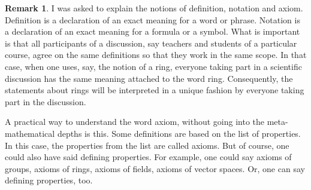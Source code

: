 \documentclass[11pt]{article}
\theoremstyle{plain}
\theoremstyle{definition}
\newtheorem{rem}[theorem]{Remark}
\begin{document}
 \begin{rem} 
 	I was asked to explain the notions of definition, notation and axiom. Definition is a declaration of an exact meaning for a word or phrase. Notation is a declaration of an exact meaning for a formula or a symbol. What is important is that all participants of a discussion, say teachers and students of a particular course, agree on the same definitions so that they work in the same scope. In that case, when one uses, say, the notion of a ring, everyone taking part in a scientific discussion has the same meaning attached to the word ring. Consequently, the statements about rings will be interpreted in a unique fashion by everyone taking part in the discussion. 
 
	A practical way to understand the word axiom, without going into the meta-mathematical depths is this. Some definitions are based on the list of properties. In this case, the properties from the list are called axioms. But of course, one could also have said defining properties. For example, one could say axioms of groups, axioms of rings, axioms of fields, axioms of vector spaces. Or, one can say defining properties, too. 
 \end{rem} 
\end{document}
